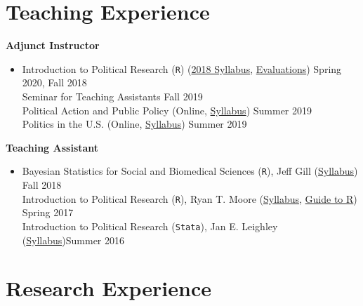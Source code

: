 \documentclass[11pt]{article}
\begin{document}
\begin{flushleft}
\section*{Teaching Experience}

\textbf{Adjunct Instructor}

\vspace{-0.3cm}
\begin{itemize}
\item[] Introduction to Political Research (\texttt{R}) (\href{https://www.simonheuberger.com/files/teaching/syll_fall_2018_310.pdf}{2018 Syllabus}, \href{https://www.simonheuberger.com/files/teaching/evals_fall_2018_310.pdf}{Evaluations}) \hfill{Spring 2020, Fall 2018}\\
Seminar for Teaching Assistants \hfill{Fall 2019}\\
Political Action and Public Policy (Online, \href{https://www.simonheuberger.com/files/teaching/syll_summer_2019_102.pdf}{Syllabus}) \hfill{Summer 2019}\\
Politics in the U.S. (Online, \href{https://www.simonheuberger.com/files/teaching/syll_summer_2019_110.pdf}{Syllabus}) \hfill{Summer 2019}
\end{itemize}


\textbf{Teaching Assistant}

\vspace{-0.3cm}
\begin{itemize}
\item[] Bayesian Statistics for Social and Biomedical Sciences (\texttt{R}), Jeff Gill (\href{http://jeffgill.org/classes/american-university-statistics-618spa-696-every-fall-bayesian-statistics-social-and}{Syllabus}) \hfill{Fall 2018}\\

Introduction to Political Research (\texttt{R}), Ryan T. Moore (\href{https://www.simonheuberger.com/files/teaching/syll_spring_2017_310.pdf}{Syllabus}, \href{https://www.simonheuberger.com/files/teaching/intro_using_r.pdf}{Guide to R}) \hfill{Spring 2017}\\

Introduction to Political Research (\texttt{Stata}), Jan E. Leighley (\href{https://www.simonheuberger.com/files/teaching/syll_summer_2016_310.pdf}{Syllabus})\hfill{Summer 2016}
\end{itemize}



\section*{Research Experience}


\end{flushleft}
\end{document}
